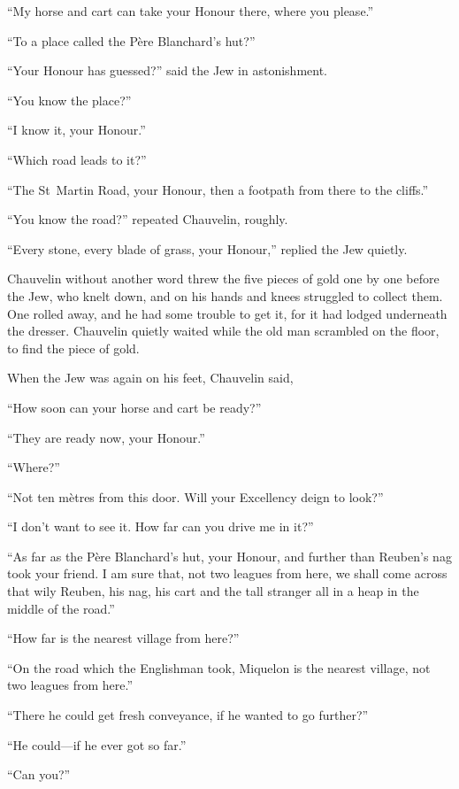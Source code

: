 \enquote{My horse and cart can take your Honour there, where you please.}

\enquote{To a place called the Père Blanchard's hut?}

\enquote{Your Honour has guessed?} said the Jew in astonishment.

\enquote{You know the place?}

\enquote{I know it, your Honour.}

\enquote{Which road leads to it?}

\enquote{The St~Martin Road, your Honour, then a footpath from there to the cliffs.}

\enquote{You know the road?} repeated Chauvelin, roughly.

\enquote{Every stone, every blade of grass, your Honour,} replied the Jew quietly.

Chauvelin without another word threw the five pieces of gold one by one before the Jew, who knelt down, and on his hands and knees struggled to collect them. One rolled away, and he had some trouble to get it, for it had lodged underneath the dresser. Chauvelin quietly waited while the old man scrambled on the floor, to find the piece of gold.

When the Jew was again on his feet, Chauvelin said,\longdash


\enquote{How soon can your horse and cart be ready?}

\enquote{They are ready now, your Honour.}

\enquote{Where?}

\enquote{Not ten mètres from this door. Will your Excellency deign to look?}

\enquote{I don't want to see it. How far can you drive me in it?}

\enquote{As far as the Père Blanchard's hut, your Honour, and further than Reuben's nag took your friend. I am sure that, not two leagues from here, we shall come across that wily Reuben, his nag, his cart and the tall stranger all in a heap in the middle of the road.}

\enquote{How far is the nearest village from here?}

\enquote{On the road which the Englishman took, Miquelon is the nearest village, not two leagues from here.}

\enquote{There he could get fresh conveyance, if he wanted to go further?}

\enquote{He could---if he ever got so far.}

\enquote{Can you?}

